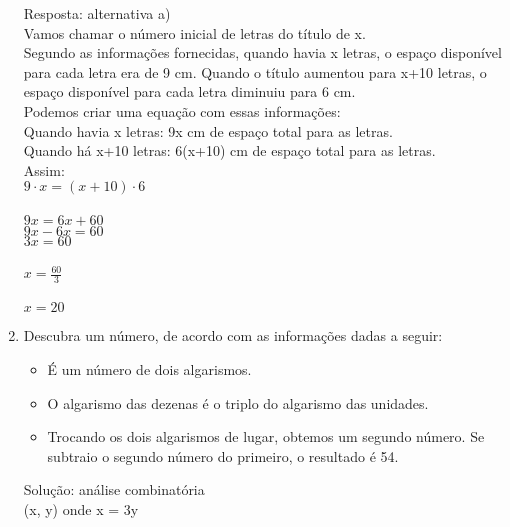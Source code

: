 \documentclass[a4paper,14pt]{article}
\begin{document}
\begin{multicols}{2}
\begin{enumerate}
        Resposta: alternativa a) \\
        
        Vamos chamar o número inicial de letras do título de x.\\
        
        Segundo as informações fornecidas, quando havia x letras, o espaço disponível para cada letra era de 9 cm. Quando o título aumentou para x+10 letras, o espaço disponível para cada letra diminuiu para 6 cm.\\
        
        Podemos criar uma equação com essas informações:\\
        
        Quando havia x letras: 9x cm de espaço total para as letras.\\
        
        Quando há x+10 letras: 6(x+10) cm de espaço total para as letras. \\
        
        Assim:\\
        $9 \cdot x=(x+10) \cdot 6$\\\\
         
        $9x=6x+60$ \\
        $9x-6x=60$ \\
        $3x=60$ \\ \\
        $x = \frac{60}{3}$\\ \\
        $x=20$ \\
        
        \item Descubra um número, de acordo com as informações dadas a seguir:
        \begin{itemize}
        	\item É um número de dois algarismos.
        	\item O algarismo das dezenas é o triplo do algarismo das unidades.
        	\item Trocando os dois algarismos de lugar, obtemos um segundo número. Se subtraio o segundo número do primeiro, o resultado é 54.
        \end{itemize}
    
        Solução: análise combinatória \\
        (x, y) onde x = 3y \\


\end{enumerate}
\end{multicols}
\end{document}
